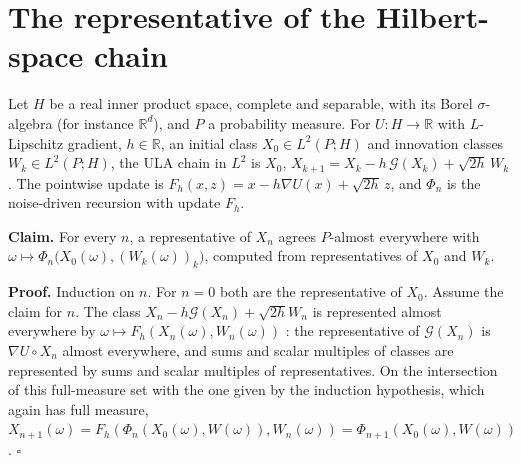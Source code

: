 \documentclass[11pt,a4paper]{article}
\begin{document}
\section{\texorpdfstring{The representative of the Hilbert-space chain}{The representative of the Hilbert-space chain}}


Let \(H\) be a real inner product space, complete and separable, with its Borel \(\sigma\)-algebra (for instance \(\mathbb R^d\)), and \(P\) a probability measure. For \(U:H\to\mathbb R\) with \(L\)-Lipschitz gradient, \(h\in\mathbb R\), an initial class \(X_0\in L^2(P;H)\) and innovation classes \(W_k\in L^2(P;H)\), the ULA chain in \(L^2\) is \(X_0\), \(X_{k+1}=X_k-h\,\mathcal G(X_k)+\sqrt{2h}\,W_k\). The pointwise update is \(F_h(x,z)=x-h\nabla U(x)+\sqrt{2h}\,z\), and \(\Phi_n\) is the noise-driven recursion with update \(F_h\).




\textbf{Claim.} For every \(n\), a representative of \(X_n\) agrees \(P\)-almost everywhere with \(\omega\mapsto\Phi_n\bigl(X_0(\omega),(W_k(\omega))_{k}\bigr)\), computed from representatives of \(X_0\) and \(W_k\).




\textbf{Proof.} Induction on \(n\). For \(n=0\) both are the representative of \(X_0\). Assume the claim for \(n\). The class \(X_n-h\mathcal G(X_n)+\sqrt{2h}W_n\) is represented almost everywhere by \(\omega\mapsto F_h(X_n(\omega),W_n(\omega))\) \cite[Section~3.13.12]{LangevinLean2026ULASC}: the representative of \(\mathcal G(X_n)\) is \(\nabla U\circ X_n\) almost everywhere, and sums and scalar multiples of classes are represented by sums and scalar multiples of representatives. On the intersection of this full-measure set with the one given by the induction hypothesis, which again has full measure, \(X_{n+1}(\omega)=F_h(\Phi_n(X_0(\omega),W(\omega)),W_n(\omega))=\Phi_{n+1}(X_0(\omega),W(\omega))\). \(\square\)
\end{document}
